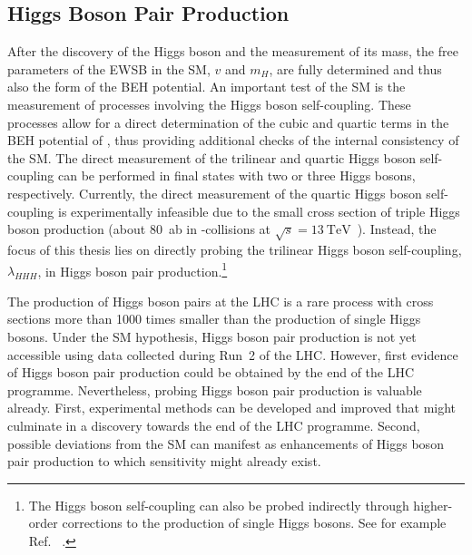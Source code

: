 \subsection{Higgs Boson Pair Production}%
\label{fig:theory_higgs_pair_prod}


After the discovery of the Higgs boson and the measurement of its mass, the free
parameters of the EWSB in the SM, $v$ and $m_H$, are fully determined and thus
also the form of the BEH potential. An important test of the SM is the
measurement of processes involving the Higgs boson self-coupling. These
processes allow for a direct determination of the cubic and quartic terms in the
BEH potential of , thus providing additional checks of
the internal consistency of the SM. The direct measurement of the trilinear and
quartic Higgs boson self-coupling can be performed in final states with two or
three Higgs bosons, respectively. Currently, the direct measurement of the
quartic Higgs boson self-coupling is experimentally infeasible due to the small
cross section of triple Higgs boson production (about \SI{80}{\atto\barn} in
\pp-collisions at $\sqrt{s} = \SI{13}{\TeV}$~\cite{Maltoni:2014eza}). Instead,
the focus of this thesis lies on directly probing the trilinear Higgs boson
self-coupling, $\lambda_{HHH}$, in Higgs boson pair production.\footnote{The
  Higgs boson self-coupling can also be probed indirectly through higher-order
  corrections to the production of single Higgs bosons. See for example
  Ref.~\cite{Degrassi:2016wml} \cite{ATLAS-CONF-2022-050}.}



The production of Higgs boson pairs at the LHC is a rare process with cross
sections more than 1000 times smaller than the production of single Higgs
bosons. Under the SM hypothesis, Higgs boson pair production is not yet
accessible using data collected during Run~2 of the LHC. However, first evidence
of Higgs boson pair production could be obtained by the end of the LHC
programme. Nevertheless, probing Higgs boson pair production is valuable
already. First, experimental methods can be developed and improved that might
culminate in a discovery towards the end of the LHC programme. Second, possible
deviations from the SM can manifest as enhancements of Higgs boson pair
production to which sensitivity might already exist.


